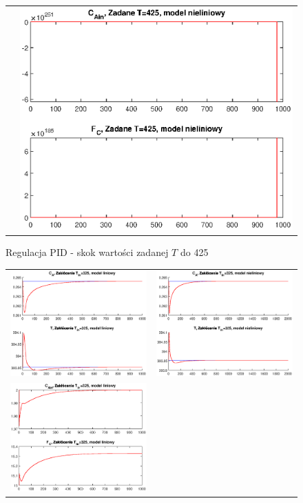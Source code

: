 \begin{figure}
\begin{tabular}{cc}
	&
	\includegraphics[width=.5\linewidth]{img/pidnlin/pidnlin7.eps}
\end{tabular}
\label{ch2:pid4}
\caption{Regulacja PID - skok wartości zadanej $T$ do 425}
\end{figure}
\newpage
\begin{figure}
\begin{tabular}{cc}
	\includegraphics[width=.5\linewidth]{img/pidlin/pidlin10.eps}
	&
	\includegraphics[width=.5\linewidth]{img/pidnlin/pidnlin10.eps}
	\\
	\includegraphics[width=.5\linewidth]{img/pidlin/pidlin9.eps}

\end{tabular}
\end{figure}
